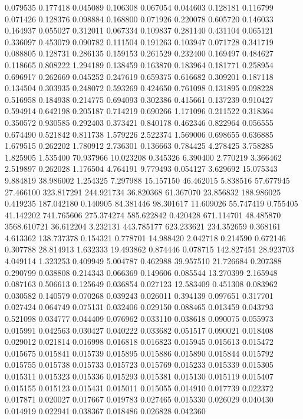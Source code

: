 0.079535
0.177418
0.045089
0.106308
0.067054
0.044603
0.128181
0.116799
0.071426
0.128376
0.098884
0.168800
0.071926
0.220078
0.605720
0.146033
0.164937
0.055027
0.312011
0.067334
0.109837
0.281140
0.431104
0.065121
0.336097
0.453079
0.090782
0.111504
0.191263
0.103947
0.071728
0.341719
0.088805
0.128731
0.286135
0.159153
0.261529
0.232400
0.169497
0.484627
0.118665
0.808222
1.294189
0.138459
0.163870
0.183964
0.181771
0.258954
0.696917
0.262669
0.045252
0.247619
0.659375
0.616682
0.309201
0.187118
0.134504
0.303935
0.248072
0.593269
0.424650
0.761098
0.131895
0.098228
0.516958
0.184938
0.214775
0.694093
0.302386
0.415661
0.137239
0.910427
0.594914
0.642198
0.205187
0.714219
0.690266
1.171096
0.211522
0.318364
0.350572
0.930585
0.292403
0.373421
0.840178
0.462346
0.822964
0.056555
0.674490
0.521842
0.811738
1.579226
2.522374
1.569006
0.698655
0.636885
1.679515
0.262202
1.780912
2.736301
0.136663
0.784425
4.278425
3.758285
1.825905
1.535400
70.937966
10.023208
0.345326
6.390400
2.770219
3.366462
2.519897
0.262028
1.176504
4.764191
9.779493
0.054127
3.629692
15.075343
9.884819
38.986002
1.254325
7.297988
15.157150
46.462015
5.838516
57.677945
27.466100
323.817291
244.921734
36.820368
61.367070
23.856832
188.986025
0.419235
187.042180
0.140905
84.381446
98.301617
11.609026
55.747419
0.755405
41.142202
741.765606
275.374274
585.622842
0.420428
671.114701
48.485870
3568.610721
36.612204
3.232131
443.785177
623.233621
234.352659
0.368161
4.613362
138.737378
0.154321
0.778701
14.988420
2.042718
0.214590
0.672146
0.307788
28.814913
1.632333
19.493862
0.874446
0.078715
142.827451
28.923703
4.049114
1.323253
0.409949
5.004787
0.462988
39.957510
21.726684
0.207388
0.290799
0.038808
0.214343
0.066369
0.149606
0.085544
13.270399
2.165948
0.087163
0.506613
0.125649
0.036854
0.027123
12.583409
0.451308
0.083962
0.030582
0.140579
0.070268
0.039243
0.026011
0.394139
0.097651
0.317701
0.027424
0.064749
0.075131
0.032406
0.029150
0.088465
0.013459
0.043793
0.521098
0.034777
0.044409
0.076962
0.033110
0.038618
0.090075
0.055973
0.015991
0.042563
0.030427
0.040222
0.033682
0.051517
0.090021
0.018408
0.029012
0.021814
0.016998
0.016818
0.016823
0.015945
0.015613
0.015472
0.015675
0.015841
0.015739
0.015895
0.015886
0.015890
0.015844
0.015792
0.015755
0.015738
0.015733
0.015723
0.015769
0.015233
0.015339
0.015305
0.015311
0.015323
0.015336
0.015293
0.015381
0.015130
0.015119
0.015407
0.015155
0.015123
0.015431
0.015011
0.015055
0.014910
0.017739
0.022372
0.017871
0.020027
0.017667
0.019783
0.027465
0.015330
0.026029
0.040430
0.014919
0.022941
0.038367
0.018486
0.026828
0.042360
